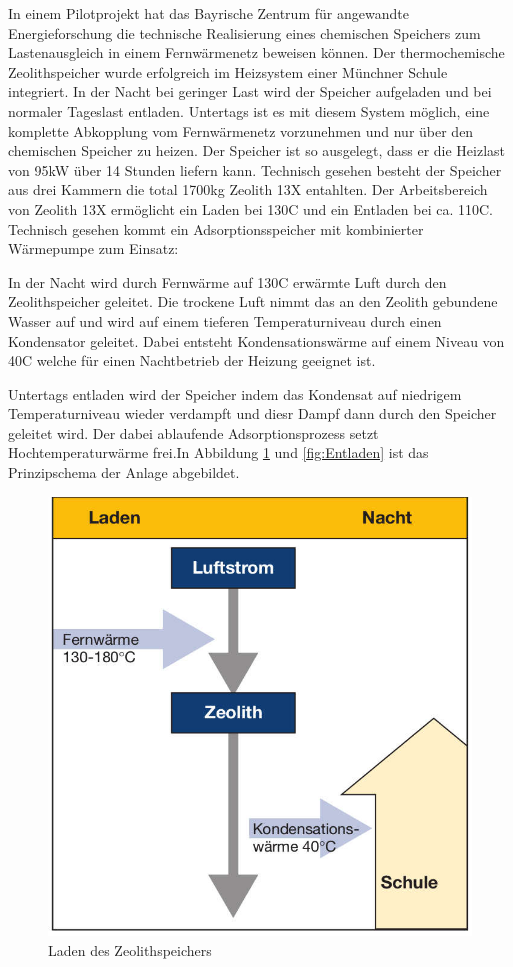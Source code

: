 \documentclass[11pt,a4paper]{scrartcl}
\begin{document}
In einem Pilotprojekt hat das Bayrische Zentrum für angewandte Energieforschung
die technische Realisierung eines chemischen Speichers zum Lastenausgleich in
einem Fernwärmenetz beweisen können. Der thermochemische Zeolithspeicher wurde
erfolgreich im Heizsystem einer Münchner Schule integriert. In der Nacht bei
geringer Last wird der Speicher aufgeladen und bei normaler Tageslast entladen.
Untertags ist es mit diesem System möglich, eine komplette Abkopplung vom
Fernwärmenetz vorzunehmen und nur über den chemischen Speicher zu heizen. Der
Speicher ist so ausgelegt, dass er die Heizlast von 95kW über 14 Stunden liefern
kann. Technisch gesehen besteht der Speicher aus drei Kammern die total 1700kg
Zeolith 13X entahlten. Der Arbeitsbereich von Zeolith 13X ermöglicht ein Laden
bei 130\textdegree C und ein Entladen bei ca. 110\textdegree C. Technisch
gesehen kommt ein Adsorptionsspeicher mit kombinierter Wärmepumpe zum Einsatz:

In der Nacht wird durch Fernwärme auf 130\textdegree C erwärmte Luft durch den
Zeolithspeicher geleitet. Die trockene Luft nimmt das an den Zeolith gebundene
Wasser auf und wird auf einem tieferen Temperaturniveau durch einen Kondensator
geleitet. Dabei entsteht Kondensationswärme auf einem Niveau von 40\textdegree C
welche für einen Nachtbetrieb der Heizung geeignet ist. 

Untertags entladen wird der Speicher indem das Kondensat auf niedrigem
Temperaturniveau wieder verdampft und diesr Dampf dann durch den Speicher
geleitet wird. Der dabei ablaufende Adsorptionsprozess setzt Hochtemperaturwärme
frei.In Abbildung \ref{fig:Laden} und \ref{fig:Entladen} ist das Prinzipschema
der Anlage abgebildet.

\begin{figure}[h!]
\begin{center}
\includegraphics[scale=1]{images/Laden.jpg}
\caption{Laden des Zeolithspeichers \cite{BINE2}}
\label{fig:Laden}
\end{center}
\end{figure}
\end{document}
